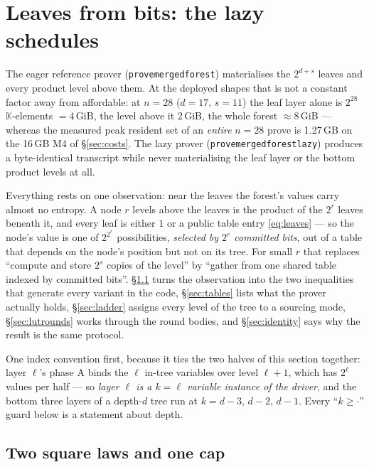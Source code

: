 \documentclass[11pt]{article}
\newcommand{\K}{\mathbb{K}}            %
\newcommand{\code}[1]{{\def\_{\textunderscore\allowbreak}\texttt{#1}}}
\theoremstyle{definition}
\begin{document}
\section{Leaves from bits: the lazy schedules}
\label{sec:lazy}

The eager reference prover (\code{prove\_merged\_forest}) materialises
the $2^{d+s}$ leaves and every product level above them.  At the
deployed shapes that is not a constant factor away from affordable: at
$n = 28$ ($d = 17$, $s = 11$) the leaf layer alone is $2^{28}$
$\K$-elements $=4$\,GiB, the level above it 2\,GiB, the whole forest
${\approx}8$\,GiB --- whereas the measured peak resident set of an
\emph{entire} $n = 28$ prove is 1.27\,GB on the 16\,GB M4 of
\S\ref{sec:costs}.  The lazy prover
(\code{prove\_merged\_forest\_lazy}) produces a byte-identical
transcript while never materialising the leaf layer or the bottom
product levels at all.

Everything rests on one observation: near the leaves the forest's values
carry almost no entropy.  A node $r$ levels above the leaves is the
product of the $2^r$ leaves beneath it, and every leaf is either $1$ or
a public table entry \eqref{eq:leaves} --- so the node's value is one of
$2^{2^r}$ possibilities, \emph{selected by $2^r$ committed bits}, out of
a table that depends on the node's position but not on its tree.  For
small $r$ that replaces ``compute and store $2^s$ copies of the level''
by ``gather from one shared table indexed by committed bits''.
\S\ref{sec:square} turns the observation into the two inequalities that
generate every variant in the code, \S\ref{sec:tables} lists what the
prover actually holds, \S\ref{sec:ladder} assigns every level of the
tree to a sourcing mode, \S\ref{sec:lutrounds} works through the round
bodies, and \S\ref{sec:identity} says why the result is the same
protocol.

One index convention first, because it ties the two halves of this
section together: layer $\ell$'s phase A binds the $\ell$ in-tree
variables over level $\ell + 1$, which has $2^\ell$ values per half ---
so \emph{layer $\ell$ is a $k = \ell$ variable instance of the driver},
and the bottom three layers of a depth-$d$ tree run at
$k = d-3,\, d-2,\, d-1$.  Every ``$k \ge \cdot$'' guard below is a
statement about depth.

\subsection{Two square laws and one cap}
\label{sec:square}
\end{document}

